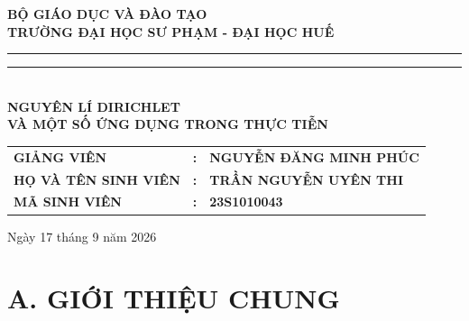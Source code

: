 \documentclass[12pt,a4paper]{article}
\theoremstyle{definition}
\begin{document}
\begin{titlepage}
    \begin{center}
        \large \textbf{BỘ GIÁO DỤC VÀ ĐÀO TẠO} \\[0.2cm]
        \textbf{\Large TRƯỜNG ĐẠI HỌC SƯ PHẠM - ĐẠI HỌC HUẾ} \\[0.4cm]
        
        \rule{0.35\textwidth}{0.4pt} \hspace{0.2cm} \raisebox{-0.6ex}{\large$\diamondsuit$} \hspace{0.2cm} \rule{0.35\textwidth}{0.4pt} \\[3.5cm]
        
        {\color{blue!80!black} \huge \textbf{NGUYÊN LÍ DIRICHLET}} \\[0.6cm]
        {\color{blue!80!black} \Large \textbf{VÀ MỘT SỐ ỨNG DỤNG TRONG THỰC TIỄN}} \\[4.0cm]
        
        \begin{table}[h!]
            \centering
            \large
            \begin{tabular}{lll}
                \textbf{GIẢNG VIÊN}          & \textbf{:} & \textbf{NGUYỄN ĐĂNG MINH PHÚC} \\[0.4cm]
                \textbf{HỌ VÀ TÊN SINH VIÊN} & \textbf{:} & \textbf{TRẦN NGUYỄN UYÊN THI} \\[0.4cm]
                \textbf{MÃ SINH VIÊN}        & \textbf{:} & \textbf{23S1010043} \\
            \end{tabular}
        \end{table}
        
        \vfill
        
        \large Ngày 17 tháng 9 năm 2026
    \end{center}
\end{titlepage}
\newpage

\tableofcontents
\newpage

\section*{A. GIỚI THIỆU CHUNG}
\end{document}
